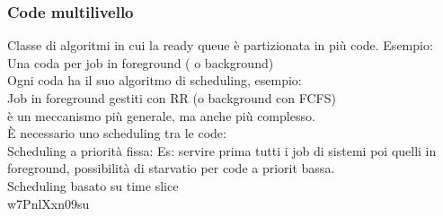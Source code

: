\documentclass{article}
\begin{document}
\subsubsection*{Code multilivello}
Classe di algoritmi in cui la ready queue \`{e} partizionata in pi\`{u} code. Esempio:\\
Una coda per job in foreground ( o background)\\
Ogni coda ha il suo algoritmo di scheduling, esempio:\\
Job in foreground gestiti con RR (o background con FCFS)\\
\`{e} un meccanismo pi\`{u} generale, ma anche pi\`{u} complesso.\\
\`{E} necessario uno scheduling tra le code:\\
Scheduling a priorit\`{a} fissa: Es: servire prima tutti i job di sistemi poi quelli in foreground, possibilit\`{a} di starvatio per code a priorit
bassa.\\
Scheduling basato su time slice\\
w7PnlXxn09su
\end{document}
